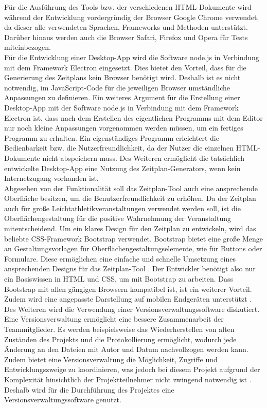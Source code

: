 Für die Ausführung des Tools bzw. der verschiedenen HTML-Dokumente wird während der Entwicklung vordergründig der Browser Google Chrome verwendet, da dieser alle verwendeten Sprachen, Frameworks und Methoden unterstützt. Darüber hinaus werden auch die Browser Safari, Firefox und Opera für Tests miteinbezogen.\\
Für die Entwicklung einer Desktop-App wird die Software node.js in Verbindung mit dem Framework Electron eingesetzt. Dies bietet den Vorteil, dass für die Generierung des Zeitplans kein Browser benötigt wird. Deshalb ist es nicht notwendig, im JavaScript-Code für die jeweiligen Browser umständliche Anpassungen zu definieren. Ein weiteres Argument für die Erstellung einer Desktop-App mit der Software node.js in Verbindung mit dem Framework Electron ist, dass nach dem Erstellen des eigentlichen Programms mit dem Editor nur noch kleine Anpassungen vorgenommen werden müssen, um ein fertiges Programm zu erhalten. Ein eigenständiges Programm erleichtert die Bedienbarkeit bzw. die Nutzerfreundlichkeit, da der Nutzer die einzelnen HTML-Dokumente nicht abspeichern muss. Des Weiteren ermöglicht die tatsächlich entwickelte Desktop-App eine Nutzung des Zeitplan-Generators, wenn kein Internetzugang vorhanden ist. \\
Abgesehen von der Funktionalität soll das Zeitplan-Tool auch eine ansprechende Oberfläche besitzen, um die Benutzerfreundlichkeit zu erhöhen. Da der Zeitplan auch für große Leichtathletikveranstaltungen verwendet werden soll, ist die Oberflächengestaltung für die positive Wahrnehmung der Veranstaltung mitentscheidend. Um ein klares Design für den Zeitplan zu entwickeln, wird das beliebte \ac{CSS}-Framework Bootstrap verwendet. Bootstrap bietet eine große Menge an Gestaltungsvorlagen für Oberflächengestaltungselemente, wie für Buttons oder Formulare. Diese ermöglichen eine einfache und schnelle Umsetzung eines ansprechenden Designs für das Zeitplan-Tool \cite{bootstrap}. Der Entwickler benötigt also nur ein Basiswissen in HTML und CSS, um mit Bootstrap zu arbeiten. Dass Bootstrap mit allen gängigen Browsern kompatibel ist, ist ein weiterer Vorteil. Zudem wird eine angepasste Darstellung auf mobilen Endgeräten unterstützt \cite{bootstrap2}.\\
Des Weiteren wird die Verwendung einer Versionsverwaltungssoftware diskutiert. Eine Versionsverwaltung ermöglicht eine bessere Zusammenarbeit der Teammitglieder. Es werden beispielsweise das Wiederherstellen von alten Zuständen des Projekts und die Protokollierung ermöglicht, wodurch jede Änderung an den Dateien mit Autor und Datum nachvollzogen werden kann.  Zudem bietet eine Versionsverwaltung die Möglichkeit, Zugriffe und Entwicklungszweige zu koordinieren, was jedoch bei diesem Projekt aufgrund der Komplexität hinsichtlich der Projektteilnehmer nicht zwingend notwendig ist \cite{git}. Deshalb wird für die Durchführung des Projektes eine Versionsverwaltungssoftware genutzt.
